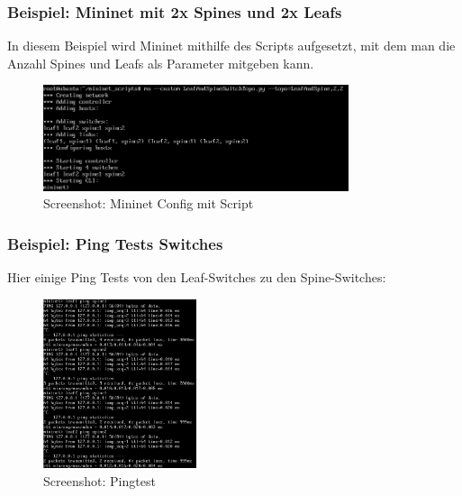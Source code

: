 \documentclass[a4,12pt]{scrartcl}
\begin{document}
\subsubsection{Beispiel: Mininet mit 2x Spines und 2x Leafs}
In diesem Beispiel wird Mininet mithilfe des Scripts aufgesetzt, mit dem man die Anzahl Spines und Leafs als Parameter mitgeben kann.
\begin{figure} [H]
	\begin{center}
	\includegraphics[width=0.80\textwidth]{./pictures/example.png}
	\caption{Screenshot: Mininet Config mit Script}
	\label{x}
	\end{center}
\end{figure} 

\subsubsection{Beispiel: Ping Tests Switches}
Hier einige Ping Tests von den Leaf-Switches zu den Spine-Switches: 
\begin{figure} [H]
	\begin{center}
	\includegraphics[width=0.40\textwidth]{./pictures/example_ping.png}
	\caption{Screenshot: Pingtest}
	\label{x}
	\end{center}
\end{figure} 
\end{document}
